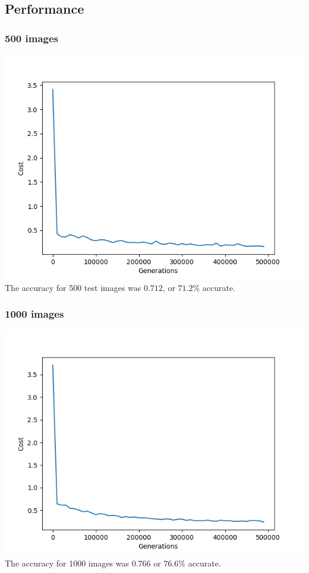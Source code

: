 \documentclass[12pt]{article}
\begin{document}
\subsection*{Performance}
\subsubsection*{500 images}
\includegraphics*[scale=0.7]{500task1} \\
The accuracy for 500 test images was $0.712$, or $71.2 \%$ accurate.   

\subsubsection*{1000 images}
\includegraphics*[scale=0.7]{1ktask1}\\
The accuracy for 1000 images was $0.766$ or $76.6 \%$ accurate.  
\end{document}
